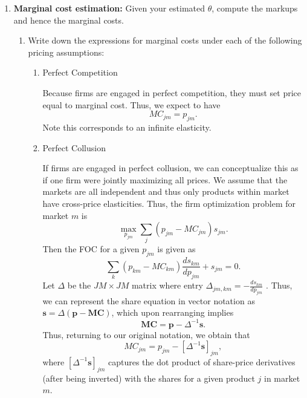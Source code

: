 \documentclass{article}
\begin{document}
\begin{enumerate}
\item \textbf{Marginal cost estimation:} Given your estimated $\theta$, compute the markups and hence the marginal costs.

\begin{enumerate}
    \item Write down the expressions for marginal costs under each of the following pricing assumptions:
    \begin{enumerate}
        \item Perfect Competition

        \begin{answer}
            Because firms are engaged in perfect competition, they must set price equal to marginal cost. Thus, we expect to have 
            \begin{equation}\label{p2_mc_pcomp}
            MC_{jm} = p_{jm}.
            \end{equation}
            Note this corresponds to an infinite elasticity. 
        \end{answer}

        \item Perfect Collusion

        \begin{answer}
            If firms are engaged in perfect collusion, we can conceptualize this as if one firm were jointly maximizing all prices. We assume that the markets are all independent and thus only products within market have cross-price elasticities. Thus, the firm optimization problem for market $m$ is
            \[
            \max_{p_{jm}} \sum_{j} (p_{jm} - MC_{jm})s_{jm}.
            \]
            Then the FOC for a given $p_{jm}$ is given as 
            \[
                \sum_{k} (p_{km} - MC_{km}) \frac{d s_{km}}{d p_{jm}} + s_{jm} = 0.
            \]
            Let $\Delta$ be the $JM \times JM$ matrix where entry $\Delta_{jm,km} = - \frac{d s_{km}}{d p_{jm}}$ . Thus, we can represent the share equation in vector notation as $\bm{s} = \Delta (\bm{p} - \bm{MC})$, which upon rearranging implies \[
                \bm{MC} = \bm{p} - \Delta^{-1}\bm{s}.
            \]
            Thus, returning to our original notation, we obtain that 
            \begin{equation}\label{p2_mc_pcol}
                MC_{jm} = p_{jm} - [\Delta^{-1}\bm{s}]_{jm},
            \end{equation}
            where $[\Delta^{-1}\bm{s}]_{jm}$ captures the dot product of share-price derivatives (after being inverted) with the shares for a given product $j$ in market $m$.
        \end{answer}



\end{enumerate}
\end{enumerate}
\end{enumerate}
\end{document}
